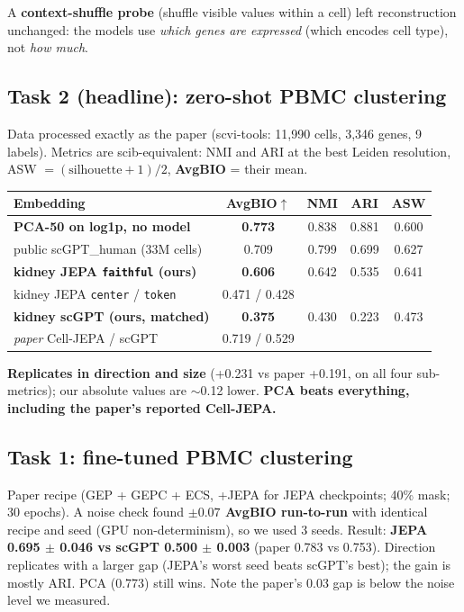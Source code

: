 \documentclass[11pt]{article}
\newcommand{\code}[1]{\texttt{\small #1}}
\newcommand{\up}{$\uparrow$}
\begin{document}
A \textbf{context-shuffle probe} (shuffle visible values within a cell) left reconstruction unchanged: the models use \emph{which genes are expressed} (which encodes cell type), not \emph{how much}.

\subsection{Task 2 (headline): zero-shot PBMC clustering}
Data processed exactly as the paper (scvi-tools: 11,990 cells, 3,346 genes, 9 labels). Metrics are scib-equivalent: NMI and ARI at the best Leiden resolution, ASW $=(\text{silhouette}+1)/2$, \textbf{AvgBIO} = their mean.
\begin{center}\small
\begin{tabular}{lcccc}
\toprule
Embedding & AvgBIO\up & NMI & ARI & ASW\\
\midrule
\textbf{PCA-50 on log1p, no model} & \textbf{0.773} & 0.838 & 0.881 & 0.600\\
public scGPT\_human (33M cells) & 0.709 & 0.799 & 0.699 & 0.627\\
\textbf{kidney JEPA \code{faithful} (ours)} & \textbf{0.606} & 0.642 & 0.535 & 0.641\\
kidney JEPA \code{center} / \code{token} & 0.471 / 0.428 & & &\\
\textbf{kidney scGPT (ours, matched)} & \textbf{0.375} & 0.430 & 0.223 & 0.473\\
\midrule
\emph{paper} Cell-JEPA / scGPT & 0.719 / 0.529 & & &\\
\bottomrule
\end{tabular}
\end{center}
\textbf{Replicates in direction and size} (+0.231 vs paper +0.191, on all four sub-metrics); our absolute values are $\sim$0.12 lower. \textbf{PCA beats everything, including the paper's reported Cell-JEPA.}

\subsection{Task 1: fine-tuned PBMC clustering}
Paper recipe (GEP + GEPC + ECS, +JEPA for JEPA checkpoints; 40\% mask; 30 epochs). A noise check found \textbf{$\pm 0.07$ AvgBIO run-to-run} with identical recipe and seed (GPU non-determinism), so we used 3 seeds. Result: \textbf{JEPA 0.695 $\pm$ 0.046 vs scGPT 0.500 $\pm$ 0.003} (paper 0.783 vs 0.753). Direction replicates with a larger gap (JEPA's worst seed beats scGPT's best); the gain is mostly ARI. PCA (0.773) still wins. Note the paper's 0.03 gap is below the noise level we measured.
\end{document}
